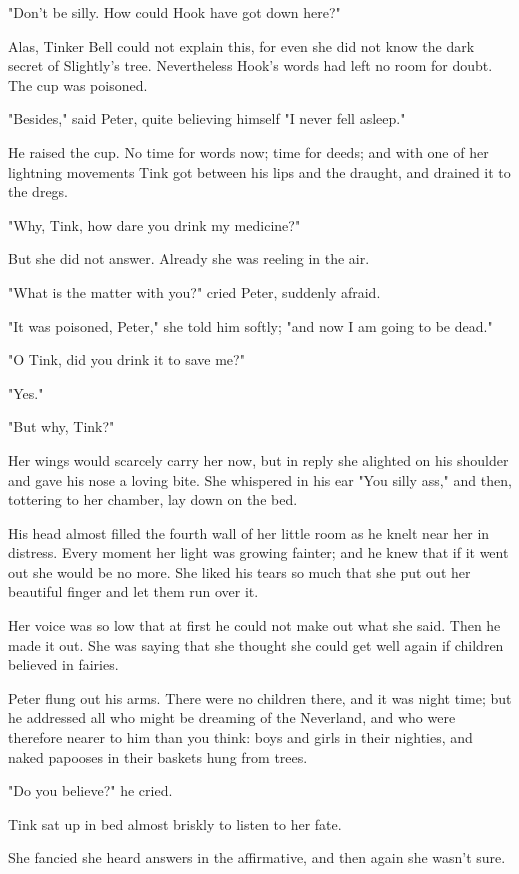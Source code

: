 "Don't be silly. How could Hook have got down here?"


Alas, Tinker Bell could not explain this, for even she did not know the
dark secret of Slightly's tree. Nevertheless Hook's words had left no room
for doubt. The cup was poisoned.


"Besides," said Peter, quite believing himself "I never fell asleep."


He raised the cup. No time for words now; time for deeds; and with one of
her lightning movements Tink got between his lips and the draught, and
drained it to the dregs.


"Why, Tink, how dare you drink my medicine?"


But she did not answer. Already she was reeling in the air.


"What is the matter with you?" cried Peter, suddenly afraid.


"It was poisoned, Peter," she told him softly; "and now I am going to be
dead."


"O Tink, did you drink it to save me?"


"Yes."


"But why, Tink?"


Her wings would scarcely carry her now, but in reply she alighted on his
shoulder and gave his nose a loving bite. She whispered in his ear "You
silly ass," and then, tottering to her chamber, lay down on the bed.


His head almost filled the fourth wall of her little room as he knelt near
her in distress. Every moment her light was growing fainter; and he knew
that if it went out she would be no more. She liked his tears so much that
she put out her beautiful finger and let them run over it.


Her voice was so low that at first he could not make out what she said.
Then he made it out. She was saying that she thought she could get well
again if children believed in fairies.


Peter flung out his arms. There were no children there, and it was night
time; but he addressed all who might be dreaming of the Neverland, and who
were therefore nearer to him than you think: boys and girls in their
nighties, and naked papooses in their baskets hung from trees.


"Do you believe?" he cried.


Tink sat up in bed almost briskly to listen to her fate.


She fancied she heard answers in the affirmative, and then again she
wasn't sure.


